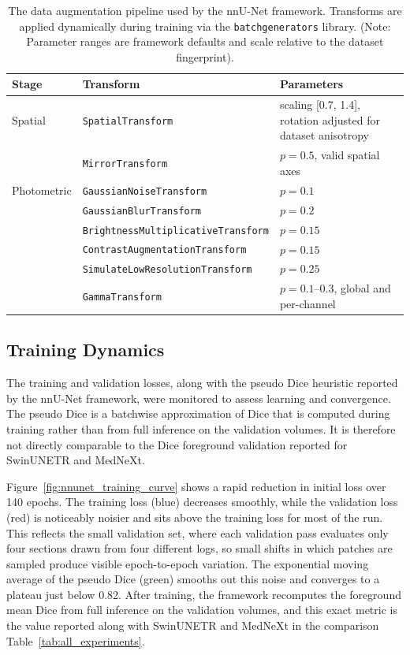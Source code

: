 \begin{table}[htbp]
\centering
\caption{The data augmentation pipeline used by the nnU-Net framework. Transforms are applied dynamically during training via the \texttt{batchgenerators} library. (Note: Parameter ranges are framework defaults and scale relative to the dataset fingerprint).}
\label{tab:nnunet_augmentation}
\small
\begin{tabularx}{\textwidth}{llX}
    \toprule
    \textbf{Stage} & \textbf{Transform} & \textbf{Parameters} \\
    \midrule
    Spatial       & \texttt{SpatialTransform}            & scaling [0.7, 1.4], rotation adjusted for dataset anisotropy \\
                  & \texttt{MirrorTransform}             & $p=0.5$, valid spatial axes \\
    \midrule
    Photometric   & \texttt{GaussianNoiseTransform}      & $p=0.1$ \\
                  & \texttt{GaussianBlurTransform}       & $p=0.2$ \\
                  & \texttt{BrightnessMultiplicativeTransform} & $p=0.15$ \\
                  & \texttt{ContrastAugmentationTransform} & $p=0.15$ \\
                  & \texttt{SimulateLowResolutionTransform} & $p=0.25$ \\
                  & \texttt{GammaTransform}              & $p=0.1$--$0.3$, global and per-channel \\
    \bottomrule
\end{tabularx}
\end{table}

\subsection{Training Dynamics}
The training and validation losses, along with the pseudo Dice heuristic reported by the nnU-Net framework, were monitored to assess learning and convergence. The pseudo Dice is a batchwise approximation of Dice that is computed during training rather than from full inference on the validation volumes. It is therefore not directly comparable to the Dice foreground validation reported for SwinUNETR and MedNeXt.

Figure~\ref{fig:nnunet_training_curve} shows a rapid reduction in initial loss over 140 epochs. The training loss (blue) decreases smoothly, while the validation loss (red) is noticeably noisier and sits above the training loss for most of the run. This reflects the small validation set, where each validation pass evaluates only four sections drawn from four different logs, so small shifts in which patches are sampled produce visible epoch-to-epoch variation. The exponential moving average of the pseudo Dice (green) smooths out this noise and converges to a plateau just below 0.82. After training, the framework recomputes the foreground mean Dice from full inference on the validation volumes, and this exact metric is the value reported along with SwinUNETR and MedNeXt in the comparison Table~\ref{tab:all_experiments}.

